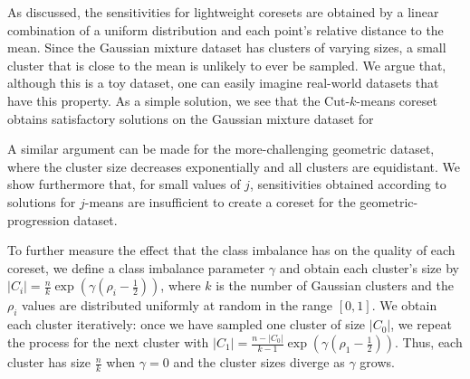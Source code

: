 
As discussed, the sensitivities for lightweight coresets are obtained by a linear combination of a uniform distribution and each point's relative
distance to the mean. Since the Gaussian mixture dataset has clusters of varying sizes, a small cluster that is close to the mean is unlikely
to ever be sampled. We argue that, although this is a toy dataset, one can easily imagine real-world datasets that have this property. 
As a simple solution, we see that the Cut-$k$-means coreset obtains satisfactory solutions on the Gaussian mixture dataset for 

A similar argument can be made for the more-challenging geometric dataset, where the cluster size decreases exponentially and all clusters are equidistant.
We show furthermore that, for small values of $j$, sensitivities obtained according to
solutions for $j$-means are insufficient to create a coreset for the geometric-progression dataset.

To further measure the effect that the class imbalance has on the quality of each coreset, we define a class imbalance parameter $\gamma$ and obtain each
cluster's size by $|C_i| = \frac{n}{k} \exp \left( \gamma(\rho_i - \frac{1}{2}) \right)$, where $k$ is the number of Gaussian clusters and the $\rho_i$ values
are distributed uniformly at random in the range $[0, 1]$.  We obtain each cluster iteratively: once we have sampled one cluster of size $|C_0|$, we repeat the
process for the next cluster with $|C_1| = \frac{n - |C_0|}{k-1}\exp \left( \gamma(\rho_1 - \frac{1}{2}) \right)$.  Thus, each cluster has size $\frac{n}{k}$
when $\gamma = 0$ and the cluster sizes diverge as $\gamma$ grows. 


